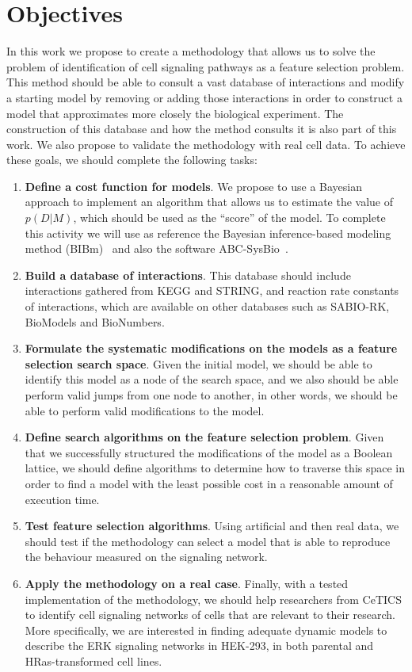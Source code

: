 \section{Objectives}
In this work we propose to create a methodology that allows us to solve
the problem of identification of cell signaling pathways as a feature 
selection problem. This method should be able to consult a vast database 
of interactions and modify a starting model by removing or adding those 
interactions in order to construct a model that approximates more 
closely the biological experiment. The construction of this database and 
how the method consults it is also part of this work. We also propose to 
validate the methodology with real cell data. To achieve these goals, we 
should complete the following tasks:
\begin{enumerate}
    \item{{\bf Define a cost function for models}. We propose to use a 
        Bayesian approach to implement an algorithm that allows us to 
        estimate the value of $p (D|M)$, which should be used as the 
        ``score'' of the model. To complete this activity we will use as 
        reference the Bayesian inference-based modeling method 
        (BIBm)~\cite{Xura20} and also the software 
        ABC-SysBio~\cite{Liepe2014}.}
    \item{{\bf Build a database of interactions}. This database should 
        include interactions gathered from KEGG and STRING, and 
        reaction rate constants of interactions, which are available on 
        other databases such as SABIO-RK, BioModels and BioNumbers.}
    \item{{\bf Formulate the systematic modifications on the models as a 
        feature selection search space}. Given the initial model, we 
        should be able to identify this model as a node of the search 
        space, and we also should be able perform valid jumps from one 
        node to another, in other words, we should be able to perform 
        valid modifications to the model.}
    \item{{\bf Define search algorithms on the feature selection 
        problem}. Given that we successfully structured the 
        modifications of the model as a Boolean lattice, we should 
        define algorithms to determine how to traverse this space in 
        order to find a model with the least possible cost in a 
        reasonable amount of execution time.}
    \item{{\bf Test feature selection algorithms}. Using artificial and
        then real data, we should test if the methodology can select a 
        model that is able to reproduce the behaviour measured
        on the signaling network.}
    \item{{\bf Apply the methodology on a real case}. Finally, with a
        tested implementation of the methodology, we should help 
        researchers from CeTICS to identify cell signaling networks of
        cells that are relevant to their research. More specifically,
        we are interested in finding adequate dynamic models to describe
        the ERK signaling networks in HEK-293, in both parental and 
        HRas-transformed cell lines.}
\end{enumerate}
